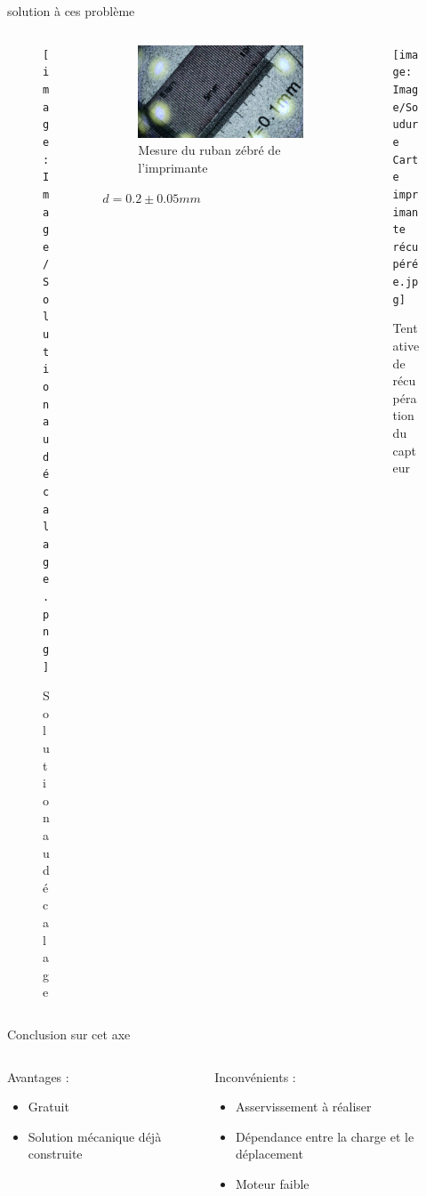 \documentclass{beamer}
\begin{document}
	\begin{frame}{solution à ces problème}
		\begin{columns}
			\begin{column}{0.3\textwidth}
				\begin{figure}
					\texttt{[image: Image/Solution au décalage.png]}
					\caption{Solution au décalage}
				\end{figure}
			\end{column}
			\begin{column}{0.3\textwidth}
				\begin{figure}
					\includegraphics[width=\textwidth]{Image/Mesure ruban imprimante.jpg}
					\caption{Mesure du ruban zébré de l'imprimante}
				\end{figure}
				$d=0.2\pm0.05mm$
			\end{column}
			\begin{column}{0.3\textwidth}
				\begin{figure}

					\texttt{[image: Image/Soudure Carte imprimante récupérée.jpg]}
					\caption{Tentative de récupération du capteur}
				\end{figure}
			\end{column}
		\end{columns}
		
	\end{frame}
	\begin{frame}{Conclusion sur cet axe}
		\begin{columns}
			\begin{column}{0.5\textwidth}
				Avantages : 
				\begin{itemize}
					\item Gratuit
					\item Solution mécanique déjà construite
				\end{itemize}
			\end{column}
			\begin{column}{0.5\textwidth}
				Inconvénients : 
				\begin{itemize}
					\item Asservissement à réaliser
					\item Dépendance entre la charge et le déplacement
					\item Moteur faible
				\end{itemize}
			\end{column}
		\end{columns}
	\end{frame}
\end{document}
